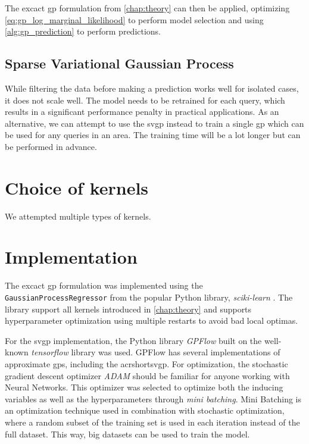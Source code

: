 The excact \acrshort{gp} formulation from \cref{chap:theory} can then be applied, optimizing \cref{eq:gp_log_marginal_likelihood} to perform model selection and using \cref{alg:gp_prediction} to perform predictions. 

\subsection{Sparse Variational Gaussian Process}
While filtering the data before making a prediction works well for isolated cases, it does not scale well. The model needs to be retrained for each query, which results in a significant performance penalty in practical applications. As an alternative, we can attempt to use the \acrshort{svgp} instead to train a single \acrshort{gp} which can be used for any queries in an area. The training time will be a lot longer but can be performed in advance. 

\section{Choice of kernels}

We attempted multiple types of kernels. 

\section{Implementation}
The excact \acrshort{gp} formulation was implemented using the \texttt{GaussianProcessRegressor} from the popular Python library, \textit{sciki-learn} \cite{scikit-learn}. The library support all kernels introduced in \cref{chap:theory} and supports hyperparameter optimization using multiple restarts to avoid bad local optimas. 

For the \acrshort{svgp} implementation, the Python library \textit{GPFlow} \cite{GPflow2017} built on the well-known \textit{tensorflow} \cite{tensorflow2015-whitepaper} library was used. GPFlow has several implementations of approximate \acrshort{gp}s, including the acrshort{svgp}. For optimization, the stochastic gradient descent optimizer \textit{ADAM} should be familiar for anyone working with Neural Networks. This optimizer was selected to optimize both the inducing variables as well as the hyperparameters through \textit{mini batching}. Mini Batching is an optimization technique used in combination with stochastic optimization, where a random subset of the training set is used in each iteration instead of the full dataset. This way, big datasets can be used to train the model.

